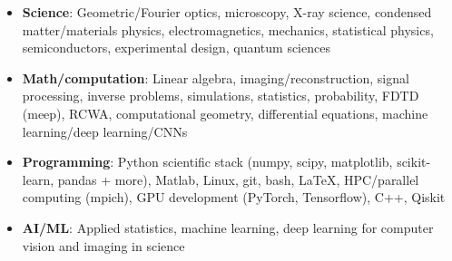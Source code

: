 \begin{itemize}
    \item \textbf{Science}: Geometric/Fourier optics, microscopy, X-ray science, condensed matter/materials physics, electromagnetics, mechanics, statistical physics, semiconductors, experimental design, quantum sciences \par
    \item \textbf{Math/computation}: Linear algebra, imaging/reconstruction, signal processing, inverse problems, simulations, statistics, probability, FDTD (meep), RCWA, computational geometry, differential equations, machine learning/deep learning/CNNs \par
    \item \textbf{Programming}: Python scientific stack (numpy, scipy, matplotlib, scikit-learn, pandas + more), Matlab, Linux, git, bash, \LaTeX, HPC/parallel computing (mpich), GPU development (PyTorch, Tensorflow), C++, Qiskit \par
    \item\textbf{AI/ML}: Applied statistics, machine learning, deep learning for computer vision and imaging in science \par
\end{itemize}
